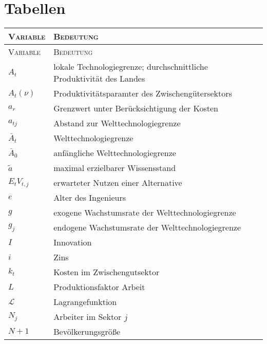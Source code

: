 
\chapter{Tabellen}
\begin{center}
\begin{longtable}{|l|l|} %
	\hline
	\textsc{Variable} & \textsc{Bedeutung}\\
	\hline
	\endfirsthead
	
	\hline
	\textsc{Variable} & \textsc{Bedeutung}\\
	\hline
	\endhead
	
	\hline
	\endfoot

	\endlastfoot
		
	
		${A}_{t} $ & lokale Technologiegrenze; durchschnittliche Produktivität des Landes\\
		$A_{t}(\nu)$ & Produktivitätsparamter des Zwischeng\"utersektors\\
		$a_{r}$ & Grenzwert unter Berücksichtigung der Kosten\\
		$a_{tj}$ & Abstand zur Welttechnologiegrenze\\%
		$\bar{A}_{t} $ & Welttechnologiegrenze\\
		$\bar{A}_{0}$ & anf\"angliche Welttechnologiegrenze\\
		$\tilde{a}$ & maximal erzielbarer Wissensstand \\
		$E_{t}V_{t,j}$ & erwarteter Nutzen einer Alternative\\
		$e$ & Alter des Ingenieurs\\
		$g$ & exogene Wachstumsrate der Welttechnologiegrenze\\
		$g_{j}$ & endogene Wachstumsrate der Welttechnologiegrenze\\
		$I$ & Innovation\\
		$i$& Zins\\
		$k_t$ & Kosten im Zwischengutsektor\\
		$L$ & Produktionsfaktor Arbeit\\
		$\mathcal{L}$ & Lagrangefunktion\\
		$N_{j}$ & Arbeiter im Sektor $j$\\
		$N+1$ & Bev\"olkerungsgrö{\ss}e\\

\end{longtable}
\end{center}
